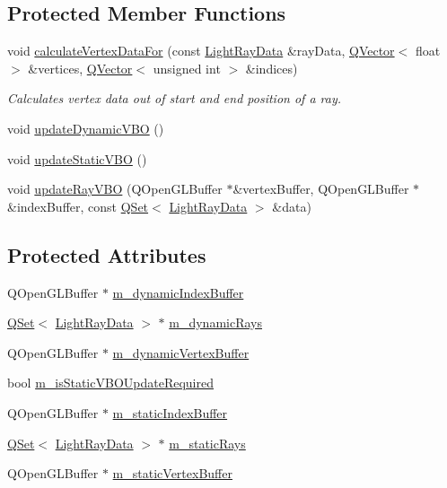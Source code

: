 \subsection*{Protected Member Functions}
\begin{DoxyCompactItemize}
\item 
void \hyperlink{class_light_ray_renderer_a6f7367b897a492fd021ea2ae43053cef}{calculate\+Vertex\+Data\+For} (const \hyperlink{class_light_ray_data}{Light\+Ray\+Data} \&ray\+Data, \hyperlink{class_q_vector}{Q\+Vector}$<$ float $>$ \&vertices, \hyperlink{class_q_vector}{Q\+Vector}$<$ unsigned int $>$ \&indices)
\begin{DoxyCompactList}\small\item\em Calculates vertex data out of start and end position of a ray. \end{DoxyCompactList}\item 
void \hyperlink{class_light_ray_renderer_aa60b1a942ae0b926f4126836dc19ea21}{update\+Dynamic\+V\+B\+O} ()
\item 
void \hyperlink{class_light_ray_renderer_a26948ed2a22fac94af809d293cecf135}{update\+Static\+V\+B\+O} ()
\item 
void \hyperlink{class_light_ray_renderer_a3e31cf1e12e66f170cb34d3620983c7c}{update\+Ray\+V\+B\+O} (Q\+Open\+G\+L\+Buffer $\ast$\&vertex\+Buffer, Q\+Open\+G\+L\+Buffer $\ast$\&index\+Buffer, const \hyperlink{class_q_set}{Q\+Set}$<$ \hyperlink{class_light_ray_data}{Light\+Ray\+Data} $>$ \&data)
\end{DoxyCompactItemize}
\subsection*{Protected Attributes}
\begin{DoxyCompactItemize}
\item 
Q\+Open\+G\+L\+Buffer $\ast$ \hyperlink{class_light_ray_renderer_afe1bab9c62f8e91c45df4680f1f878a9}{m\+\_\+dynamic\+Index\+Buffer}
\item 
\hyperlink{class_q_set}{Q\+Set}$<$ \hyperlink{class_light_ray_data}{Light\+Ray\+Data} $>$ $\ast$ \hyperlink{class_light_ray_renderer_a829e8b67018149941b5e349c336be865}{m\+\_\+dynamic\+Rays}
\item 
Q\+Open\+G\+L\+Buffer $\ast$ \hyperlink{class_light_ray_renderer_ae8c0c8b69c3dda2e8e535f3c7da7543f}{m\+\_\+dynamic\+Vertex\+Buffer}
\item 
bool \hyperlink{class_light_ray_renderer_a9931d2944cabf289973c862a714fc5fd}{m\+\_\+is\+Static\+V\+B\+O\+Update\+Required}
\item 
Q\+Open\+G\+L\+Buffer $\ast$ \hyperlink{class_light_ray_renderer_ab78cd6dadbb241b4d8929f5f1b60995a}{m\+\_\+static\+Index\+Buffer}
\item 
\hyperlink{class_q_set}{Q\+Set}$<$ \hyperlink{class_light_ray_data}{Light\+Ray\+Data} $>$ $\ast$ \hyperlink{class_light_ray_renderer_a6524c19725083f59fe41616998dcf111}{m\+\_\+static\+Rays}
\item 
Q\+Open\+G\+L\+Buffer $\ast$ \hyperlink{class_light_ray_renderer_af21bb4b6a08c84b13753860a0a89b199}{m\+\_\+static\+Vertex\+Buffer}
\end{DoxyCompactItemize}


